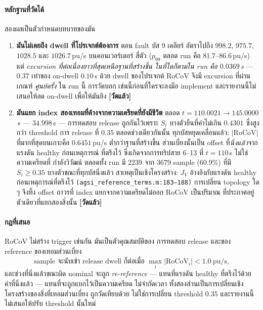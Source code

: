 \documentclass[12pt,a4paper]{article}
\theoremstyle{remark}
\newcommand{\Ssev}{S}
\newcommand{\code}[1]{\texttt{\small #1}}
\newcommand{\measured}{\textcolor{ok}{\textbf{[วัดแล้ว]}}}
\begin{document}
\paragraph{หลักฐานที่วัดได้} สองผลเป็นตัวกำหนดบทบาทของมัน

\begin{enumerate}[leftmargin=1.9em]
\item \textbf{มันไม่เคยถึง dwell ที่โปรเจกต์ต้องการ} ตอน fault บัส 9 เคลียร์
      อัตราไปถึง $998.2$, $975.7$, $1028.5$ และ $1026.7$\,pu/s บนคอนเวอร์เตอร์
      สี่ตัว ($p_{99}$ ตลอด run คือ $81.7$--$86.6$\,pu/s) แต่
      \emph{excursion ที่ต่อเนื่องยาวที่สุดเหนือฐานที่สร้างขึ้น ในที่ใดก็ตามใน run
      คือ $0.0369$\,s} --- $0.37$ เท่าของ on-dwell $0.10$\,s ด้วย dwell ของโปรเจกต์
      RoCoV จึงมี excursion ที่ผ่านเกณฑ์ \emph{ศูนย์ครั้ง} ใน run นี้ การวัดบอก
      เช่นนี้ก่อนที่ใครจะลงมือ implement และรายงานนี้ไม่เสนอให้ลด on-dwell
      เพื่อให้มันยิง \measured
\item \textbf{มันแยก index สองเทอมที่ค้างจากความเครียดที่ยังมีชีวิต}
      ตลอด $t = 110.0021 \to 145.0000$\,s --- $34.998$\,s --- การทดสอบ release
      ถูกกันไว้เพราะ $\Ssev_i$ บางตัวยืนที่ค่าไม่เกิน $0.4301$ ซึ่งสูงกว่า
      threshold การ release ที่ $0.35$ ตลอดช่วงเดียวกันนั้น ทุกบัสหยุดเคลื่อนแล้ว:
      $|\mathrm{RoCoV}|$ ที่มากที่สุดบนเกาะคือ $0.6451$\,pu/s ต่ำกว่าฐานที่สร้างขึ้น
      ส่วนเบี่ยงนั้นเป็น offset ที่\emph{นิ่งแล้ว}จากแรงดัน healthy ก่อนเหตุการณ์
      ที่ตรึงไว้ ซึ่งเกิดจากการทริปสาย 6--13 ที่ $t = 110$\,s ไม่ใช่ความเครียดที่
      กำลังวิวัฒน์ ตลอดทั้ง run มี $2239$ จาก $3679$ sample ($60.9\%$) ที่มี
      $\Ssev_i \ge 0.35$ บางตัวขณะที่ทุกบัสนิ่งแล้ว สาเหตุเป็นเชิงโครงสร้าง:
      $J_V$ อ้างอิงกับแรงดัน healthy ก่อนเหตุการณ์ที่ตรึงไว้
      \code{(agsi\_reference\_terms.m:183--188)} การเปลี่ยน topology ใด ๆ
      จึงทิ้ง offset ถาวรที่ index แยกจากความเครียดไม่ออก RoCoV เป็นปริมาณ
      ที่ประกาศอยู่ตัวเดียวที่แยกสองสิ่งนั้น \measured
\end{enumerate}

\paragraph{กฎที่เสนอ} RoCoV ไม่สร้าง trigger เช่นกัน มันเป็นตัวคุณสมบัติของ
การทดสอบ release และของ reference ของเทอมส่วนเบี่ยง
\begin{equation}
\text{sample จะนับเข้า release dwell ก็ต่อเมื่อ }
\max_i |\mathrm{RoCoV}_i| < 1.0\ \mathrm{pu/s},
\label{eq:ruleB}
\end{equation}
และช่วงที่นิ่งแล้วขณะผิด nominal จะถูก \emph{re-reference} --- แทนที่แรงดัน
healthy ที่ตรึงไว้ด้วยค่าที่นิ่งแล้ว --- แทนที่จะถูกแบกไว้เป็นความเครียด
ไม่จำกัดเวลา ทั้งสองส่วนเป็นการเปลี่ยนเชิงโครงสร้างของสิ่งที่เทอมส่วนเบี่ยง
ถูกวัดเทียบด้วย ไม่ใช่การเปลี่ยน threshold $0.35$ และรายงานนี้ไม่เสนอให้ปรับ
threshold นั้นใหม่
\end{document}
